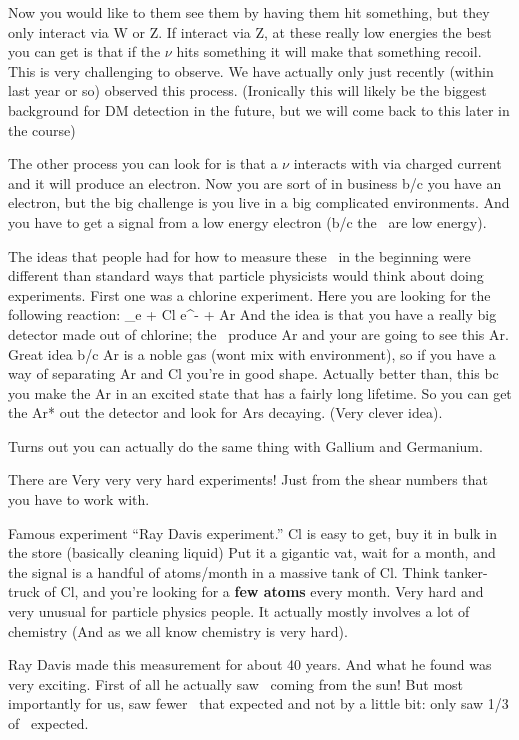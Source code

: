 {Now you would like to them see them by having them hit something, but they only interact via W or Z. 
If interact via Z, at these really low energies the best you can get is that if the $\nu$ hits something it will make that something recoil. 
This is very challenging to observe.  
We have actually only just recently (within last year or so) observed this process. 
(Ironically this will likely be the biggest background for DM detection in the future, but we will come back to this later in the course) 

The other process you can look for is that a $\nu$ interacts with via charged current and it will produce an electron. 
Now you are sort of in business b/c you have an electron, but the big challenge is you live in a big complicated environments.
And you have to get a signal from a low energy electron (b/c the \nus\ are low energy).

The ideas that people had for how to measure these \nus\ in the beginning were different than standard ways that particle physicists would think about doing experiments. 
First one was a chlorine experiment.  
Here you are looking for the following reaction:
\be
\nu_e + Cl \rightarrow e^- + Ar
\ee
And the idea is that you have a really big detector made out of chlorine; the \nus\ produce Ar and your are going to see this Ar. 
Great idea b/c Ar is a noble gas (wont mix with environment), so if you have a way of separating Ar and Cl you're in good shape. 
Actually better than, this bc you make the Ar in an excited state that has a fairly long lifetime. 
So you can get the Ar* out the detector and look for Ars decaying. (Very clever idea). 

Turns out you can actually do the same thing with Gallium and Germanium. 

There are Very very very hard experiments!
Just from the shear numbers that you have to work with. 

Famous experiment ``Ray Davis experiment.''
Cl is easy to get, buy it in bulk in the store (basically cleaning liquid)
Put it a gigantic vat, wait for a month, and the signal is a handful of atoms/month in a massive tank of Cl. 
Think tanker-truck of Cl, and you're looking for a \textbf{few atoms} every month.
Very hard and very unusual for particle physics people.
It actually mostly involves a lot of chemistry (And as we all know chemistry is very hard).

Ray Davis made this measurement for about 40 years. 
And what he found was very exciting. 
First of all he actually saw \nus\ coming from the sun!
But most importantly for us, saw fewer \nus\ that expected and not by a little bit: only saw 1/3 of \nus\ expected. 

}
